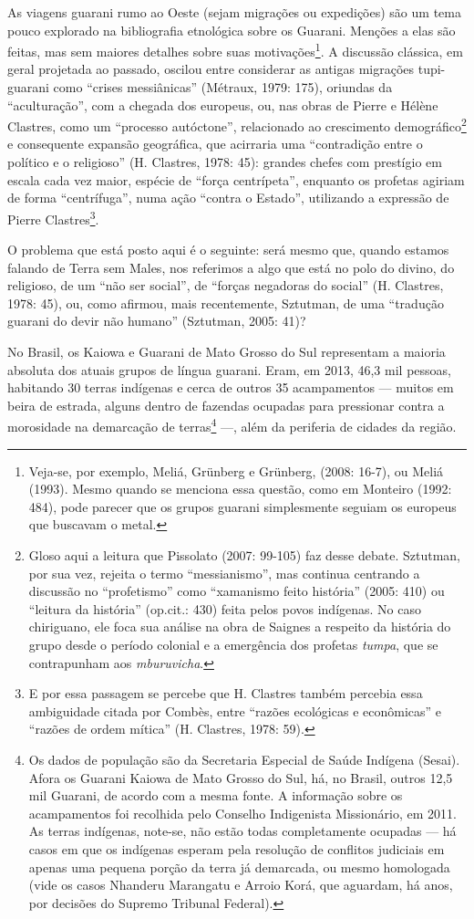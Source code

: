 As viagens guarani rumo ao Oeste (sejam migrações ou expedições) são um
tema pouco explorado na bibliografia etnológica sobre os Guarani.
Menções a elas são feitas, mas sem maiores detalhes sobre suas
motivações\footnote{Veja-se, por exemplo, Meliá, Grünberg e Grünberg,
(2008: 16-7), ou Meliá (1993). Mesmo quando se menciona essa questão,
como em Monteiro (1992: 484), pode parecer que os grupos guarani
simplesmente seguiam os europeus que buscavam o metal. }. A discussão
clássica, em geral projetada ao passado, oscilou entre considerar as
antigas migrações tupi-guarani como ``crises messiânicas'' (Métraux,
1979: 175), oriundas da ``aculturação'', com a chegada dos europeus, ou,
nas obras de Pierre e Hélène Clastres, como um ``processo autóctone'',
relacionado ao crescimento demográfico\footnote{Gloso aqui a leitura
que Pissolato (2007: 99-105) faz desse debate. Sztutman, por sua vez,
rejeita o termo ``messianismo'', mas continua centrando a discussão no
``profetismo'' como ``xamanismo feito história'' (2005: 410) ou ``leitura da
história'' (op.cit.: 430) feita pelos povos indígenas. No caso
chiriguano, ele foca sua análise na obra de Saignes a respeito da
história do grupo desde o período colonial e a emergência dos profetas
\emph{tumpa}, que se contrapunham aos \emph{mburuvicha}.} e consequente expansão
geográfica, que acirraria uma ``contradição entre o político e o
religioso'' (H. Clastres, 1978: 45): grandes chefes com prestígio em
escala cada vez maior, espécie de ``força centrípeta'', enquanto os
profetas agiriam de forma ``centrífuga'', numa ação ``contra o Estado'',
utilizando a expressão de Pierre Clastres\footnote{E por essa passagem
se percebe que H. Clastres também percebia essa ambiguidade citada por
Combès, entre ``razões ecológicas e econômicas'' e ``razões de ordem
mítica'' (H. Clastres, 1978: 59).}.

O problema que está posto aqui é o seguinte: será mesmo que, quando
estamos falando de Terra sem Males, nos referimos a algo que está no
polo do divino, do religioso, de um ``não ser social'', de ``forças
negadoras do social'' (H. Clastres, 1978: 45), ou, como afirmou, mais
recentemente, Sztutman, de uma ``tradução guarani do devir não humano''
(Sztutman, 2005: 41)?

No Brasil, os Kaiowa e Guarani de Mato Grosso do Sul representam a
maioria absoluta dos atuais grupos de língua guarani. Eram, em 2013,
46,3 mil pessoas, habitando 30 terras indígenas e cerca de outros 35
acampamentos --- muitos em beira de estrada, alguns dentro de fazendas
ocupadas para pressionar contra a morosidade na demarcação de
terras\footnote{Os dados de população são da Secretaria Especial de
Saúde Indígena (Sesai). Afora os Guarani Kaiowa de Mato Grosso do Sul,
há, no Brasil, outros 12,5 mil Guarani, de acordo com a mesma fonte. A
informação sobre os acampamentos foi recolhida pelo Conselho
Indigenista Missionário, em 2011. As terras indígenas, note-se, não
estão todas completamente ocupadas --- há casos em que os indígenas
esperam pela resolução de conflitos judiciais em apenas uma pequena
porção da terra já demarcada, ou mesmo homologada (vide os casos
Nhanderu Marangatu e Arroio Korá, que aguardam, há anos, por decisões
do Supremo Tribunal Federal).} ---, além da periferia de cidades da
região.

